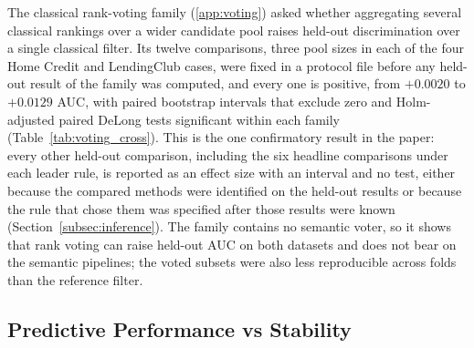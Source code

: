 \documentclass[final,5p,twocolumn]{elsarticle}
\begin{document}
The classical rank-voting family (\ref{app:voting}) asked whether aggregating several classical rankings over a wider candidate pool raises held-out discrimination over a single classical filter. Its twelve comparisons, three pool sizes in each of the four Home Credit and LendingClub cases, were fixed in a protocol file before any held-out result of the family was computed, and every one is positive, from $+0.0020$ to $+0.0129$ AUC, with paired bootstrap intervals that exclude zero and Holm-adjusted paired DeLong tests significant within each family (Table~\ref{tab:voting_cross}). This is the one confirmatory result in the paper: every other held-out comparison, including the six headline comparisons under each leader rule, is reported as an effect size with an interval and no test, either because the compared methods were identified on the held-out results or because the rule that chose them was specified after those results were known (Section~\ref{subsec:inference}). The family contains no semantic voter, so it shows that rank voting can raise held-out AUC on both datasets and does not bear on the semantic pipelines; the voted subsets were also less reproducible across folds than the reference filter.

\subsection{Predictive Performance vs Stability}
\label{subsec:performance_vs_stability}
\end{document}
